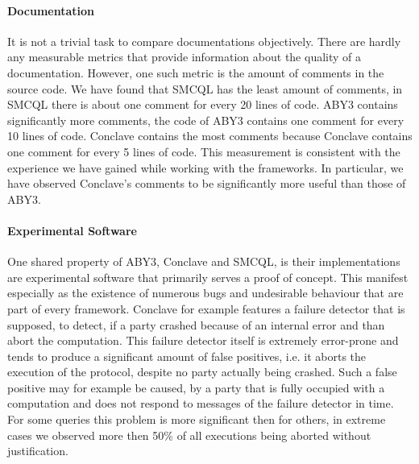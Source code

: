 \paragraph{Documentation}
It is not a trivial task to compare documentations objectively. There are hardly any measurable metrics that provide information about the quality of a documentation. However, one such metric is the amount of comments in the source code. We have found that SMCQL has the least amount of comments, in SMCQL there is about one comment for every 20 lines of code. ABY3 contains significantly more comments, the code of ABY3 contains one comment for every 10 lines of code. Conclave contains the most comments because Conclave contains one comment for every 5 lines of code. This measurement is consistent with the experience we have gained while working with the frameworks. In particular, we have observed Conclave's comments to be significantly more useful than those of ABY3. 
\paragraph{Experimental Software}
One shared property of ABY3, Conclave and SMCQL, is their implementations are experimental software that primarily serves a proof of concept. This manifest especially as the existence of numerous bugs and undesirable behaviour that are part of every framework. Conclave for example features a failure detector that is supposed, to detect, if a party crashed because of an  internal error and than abort the computation. This failure detector itself is extremely error-prone and tends to produce a significant amount of false positives, i.e. it aborts the execution of the protocol, despite no party actually being crashed. Such a false positive may for example be caused, by a party that is fully occupied with a computation and does not respond to messages of the failure detector in time. For some queries this problem is more significant then for others, in extreme cases we observed more then 50\% of all executions being aborted without justification. %



